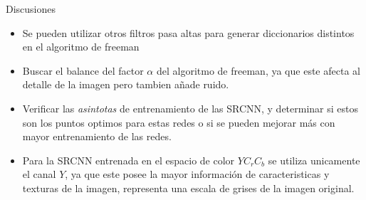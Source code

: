 \begin{frame}{Discusiones}
    \begin{block}{}
        \begin{itemize}
            \item Se pueden utilizar otros filtros pasa altas para generar diccionarios distintos en el algoritmo de freeman
            \pause
            \item Buscar el balance del factor $\alpha$ del algoritmo de freeman, ya que este afecta al detalle de la imagen pero
                  tambien añade ruido.
            \pause
            \item Verificar las \emph{asintotas} de entrenamiento de las SRCNN, y determinar si estos son los puntos optimos para estas
                  redes o si se pueden mejorar más con mayor entrenamiento de las redes.
            \pause
            \item Para la SRCNN entrenada en el espacio de color $YC_rC_b$ se utiliza unicamente el canal $Y$, ya que este posee la mayor
                  información de caracteristicas y texturas de la imagen, representa una escala de grises de la imagen original.
        \end{itemize}
    \end{block}
\end{frame}